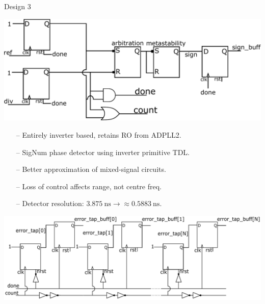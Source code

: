 \documentclass{beamer}
\begin{document}
\begin{frame}{Design 3}
	\vspace{-0.4 cm}	
	\begin{center}
		\includegraphics[width=0.75\linewidth]{../new_pdet1}
	\end{center}
	\vspace{-0.4 cm}
	\begin{itemize}
		\item[--]
			Entirely inverter based, retains RO from ADPLL2.
		\item[--]
			SigNum phase detector using inverter primitive TDL.
		\item[--]
			Better approximation of mixed-signal circuits.
		\item[--]
			Loss of control affects range, not centre freq.
		\item[--]
			Detector resolution: $3.875~\si{\nano\second}\rightarrow \approx 0.5883~\si{\nano\second}$.
	\end{itemize}	
	\begin{center}
		\includegraphics[width=0.75\linewidth]{../new_pdet2}
	\end{center}
\end{frame}
\end{document}
